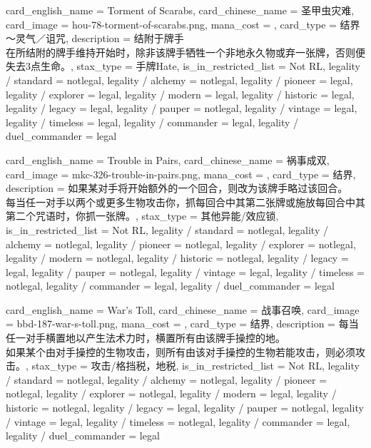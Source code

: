 \documentclass[lang = cn, color = black, 10pt]{AllThatStax}
\begin{document}
\card
{
	card_english_name = {Torment of Scarabs},
	card_chinese_name = {圣甲虫灾难},
	card_image = hou-78-torment-of-scarabs.png,
	mana_cost = ,
	card_type = 结界～灵气／诅咒,
	description = {结附于牌手\\
在所结附的牌手维持开始时，除非该牌手牺牲一个非地永久物或弃一张牌，否则便失去3点生命。},
	stax_type = 手牌Hate,
	is_in_restricted_list = Not RL,
	legality / standard = notlegal,
	legality / alchemy = notlegal,
	legality / pioneer = legal,
	legality / explorer = legal,
	legality / modern = legal,
	legality / historic = legal,
	legality / legacy = legal,
	legality / pauper = notlegal,
	legality / vintage = legal,
	legality / timeless = legal,
	legality / commander = legal,
	legality / duel_commander = legal
}

\card
{
	card_english_name = {Trouble in Pairs},
	card_chinese_name = {祸事成双},
	card_image = mkc-326-trouble-in-pairs.png,
	mana_cost = ,
	card_type = 结界,
	description = {如果某对手将开始额外的一个回合，则改为该牌手略过该回合。\\
每当任一对手以两个或更多生物攻击你，抓每回合中其第二张牌或施放每回合中其第二个咒语时，你抓一张牌。},
	stax_type = 其他异能/效应锁,
	is_in_restricted_list = Not RL,
	legality / standard = notlegal,
	legality / alchemy = notlegal,
	legality / pioneer = notlegal,
	legality / explorer = notlegal,
	legality / modern = notlegal,
	legality / historic = notlegal,
	legality / legacy = legal,
	legality / pauper = notlegal,
	legality / vintage = legal,
	legality / timeless = notlegal,
	legality / commander = legal,
	legality / duel_commander = legal
}

\card
{
	card_english_name = {War's Toll},
	card_chinese_name = {战事召唤},
	card_image = bbd-187-war-s-toll.png,
	mana_cost = ,
	card_type = 结界,
	description = {每当任一对手横置地以产生法术力时，横置所有由该牌手操控的地。\\
如果某个由对手操控的生物攻击，则所有由该对手操控的生物若能攻击，则必须攻击。},
	stax_type = 攻击/格挡税，地税,
	is_in_restricted_list = Not RL,
	legality / standard = notlegal,
	legality / alchemy = notlegal,
	legality / pioneer = notlegal,
	legality / explorer = notlegal,
	legality / modern = legal,
	legality / historic = notlegal,
	legality / legacy = legal,
	legality / pauper = notlegal,
	legality / vintage = legal,
	legality / timeless = notlegal,
	legality / commander = legal,
	legality / duel_commander = legal
}
\end{document}
